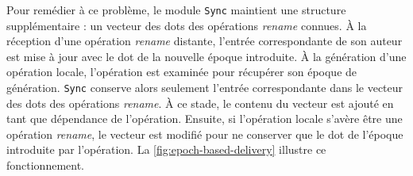 Pour remédier à ce problème, le module \texttt{Sync} maintient une structure supplémentaire : un vecteur des dots des opérations \emph{rename} connues.
À la réception d'une opération \emph{rename} distante, l'entrée correspondante de son auteur est mise à jour avec le dot de la nouvelle époque introduite.
À la génération d'une opération locale, l'opération est examinée pour récupérer son époque de génération.
\texttt{Sync} conserve alors seulement l'entrée correspondante dans le vecteur des dots des opérations \emph{rename}.
À ce stade, le contenu du vecteur est ajouté en tant que dépendance de l'opération.
Ensuite, si l'opération locale s'avère être une opération \emph{rename}, le vecteur est modifié pour ne conserver que le dot de l'époque introduite par l'opération.
La \autoref{fig:epoch-based-delivery} illustre ce fonctionnement.


